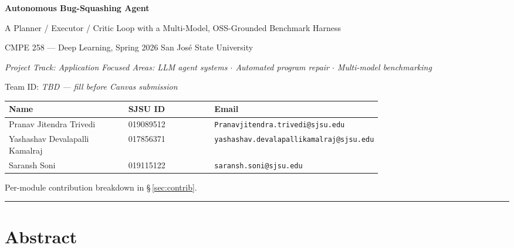 \documentclass[11pt,letterpaper]{article}
\begin{document}
\begin{center}
{\sffamily\bfseries\color{accent}\Large
Autonomous Bug-Squashing Agent\par}
\vspace{2pt}
{\sffamily\normalsize
A Planner / Executor / Critic Loop with a Multi-Model, OSS-Grounded Benchmark Harness\par}
\vspace{6pt}
{\normalsize CMPE 258 --- Deep Learning, Spring 2026 \quad\textbullet\quad San Jos\'{e} State University\par}
\vspace{4pt}
{\small\itshape Project Track: Application \quad\textbar\quad Focused Areas: LLM agent systems $\cdot$ Automated program repair $\cdot$ Multi-model benchmarking}\par
\vspace{2pt}
{\footnotesize Team ID: \textit{TBD --- fill before Canvas submission}}\par
\end{center}

\vspace{2pt}
\noindent
{\small
\begin{tabular}{@{}p{0.32\linewidth} l p{0.42\linewidth}@{}}
\toprule
\textbf{Name} & \textbf{SJSU ID} & \textbf{Email} \\
\midrule
Pranav Jitendra Trivedi          & 019089512 & \texttt{\small Pranavjitendra.trivedi@sjsu.edu} \\
Yashashav Devalapalli Kamalraj   & 017856371 & \texttt{\small yashashav.devalapallikamalraj@sjsu.edu} \\
Saransh Soni                     & 019115122 & \texttt{\small saransh.soni@sjsu.edu} \\
\bottomrule
\end{tabular}\par
}

\vspace{4pt}
{\footnotesize\textcolor{muted}{Per-module contribution breakdown in \S\,\ref{sec:contrib}.}}

\vspace{6pt}
\hrule
\vspace{8pt}

\section*{Abstract}
\end{document}
